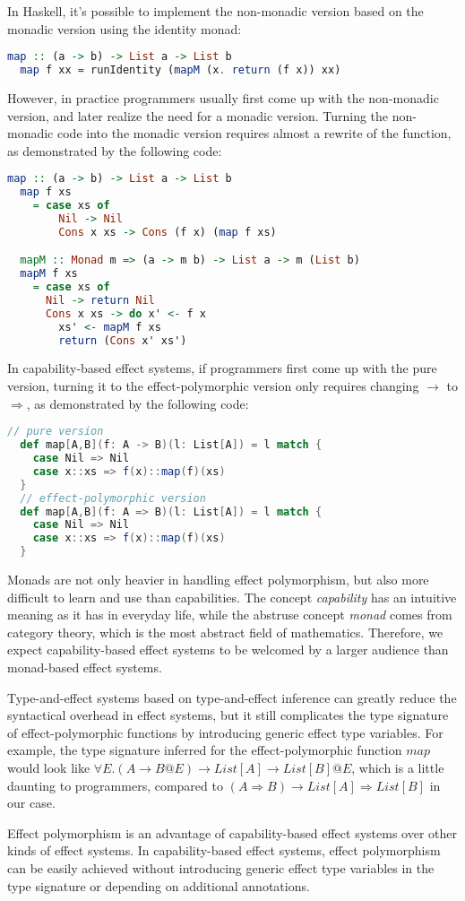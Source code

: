 In Haskell, it's possible to implement the non-monadic version based
on the monadic version using the identity monad:

\begin{lstlisting}[language=Haskell]
  map :: (a -> b) -> List a -> List b
  map f xx = runIdentity (mapM (x. return (f x)) xx)
\end{lstlisting}

However, in practice programmers usually first come up with the
non-monadic version, and later realize the need for a monadic
version. Turning the non-monadic code into the monadic version
requires almost a rewrite of the function, as demonstrated by the
following code:

\begin{lstlisting}[language=Haskell]
  map :: (a -> b) -> List a -> List b
  map f xs
    = case xs of
        Nil -> Nil
        Cons x xs -> Cons (f x) (map f xs)

  mapM :: Monad m => (a -> m b) -> List a -> m (List b)
  mapM f xs
    = case xs of
      Nil -> return Nil
      Cons x xs -> do x' <- f x
        xs' <- mapM f xs
        return (Cons x' xs')
\end{lstlisting}

In capability-based effect systems, if programmers first come up with
the pure version, turning it to the effect-polymorphic version only
requires changing $\to$ to $\Rightarrow$, as demonstrated by the
following code:

\begin{lstlisting}[language=Scala]
  // pure version
  def map[A,B](f: A -> B)(l: List[A]) = l match {
    case Nil => Nil
    case x::xs => f(x)::map(f)(xs)
  }
  // effect-polymorphic version
  def map[A,B](f: A => B)(l: List[A]) = l match {
    case Nil => Nil
    case x::xs => f(x)::map(f)(xs)
  }
\end{lstlisting}

Monads are not only heavier in handling effect polymorphism, but also
more difficult to learn and use than capabilities. The concept
\emph{capability} has an intuitive meaning as it has in everyday life,
while the abstruse concept \emph{monad} comes from category theory,
which is the most abstract field of mathematics. Therefore, we expect
capability-based effect systems to be welcomed by a larger audience
than monad-based effect systems.

Type-and-effect systems based on type-and-effect
inference\cite{talpin1992polymorphic, talpin1994type} can greatly
reduce the syntactical overhead in effect systems, but it still
complicates the type signature of effect-polymorphic functions by
introducing generic effect type variables. For example, the type
signature inferred for the effect-polymorphic function $map$ would
look like $\forall E.(A \to B @E) \to List[A] \to List[B] @E$, which
is a little daunting to programmers, compared to
$(A \Rightarrow B) \to List[A] \Rightarrow List[B]$ in our case.

Effect polymorphism is an advantage of capability-based effect systems
over other kinds of effect systems. In capability-based effect
systems, effect polymorphism can be easily achieved without
introducing generic effect type variables in the type signature or
depending on additional annotations.
